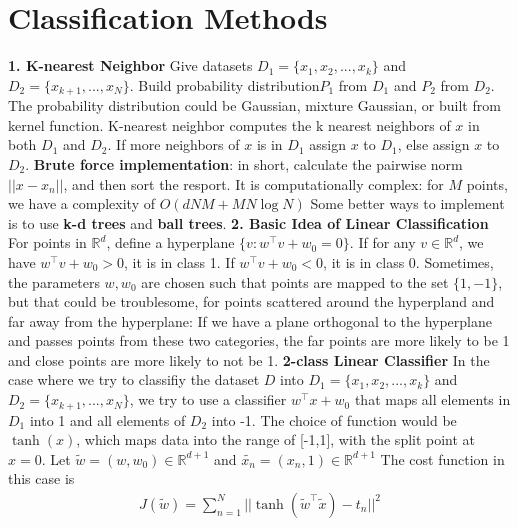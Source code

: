 \documentclass[11pt]{article}
\theoremstyle{plain}
\theoremstyle{definition}
\begin{document}
\section{Classification Methods}
\textbf{1. K-nearest Neighbor} \newline 
\vspace{5mm}
Give datasets $D_1 = \{ x_1, x_2, ..., x_k \} $ and $D_2 = \{ x_{k+1}, ..., x_N \}$. Build probability distribution$P_1$ from $D_1$ and $P_2$ from $D_2$. The probability distribution could be Gaussian, mixture Gaussian, or built from kernel function. K-nearest neighbor computes the k nearest neighbors of $x$ in both $D_1$ and $D_2$. If more neighbors of $x$ is in $D_1$ assign $x$ to $D_1$, else assign $x$ to $D_2$. \newline 
\textbf{Brute force implementation}: in short, calculate the pairwise norm $||x-x_n||$, and then sort the resport. It is computationally complex: for $M$ points, we have a complexity of $O(dNM + MN\log N)$\newline 
Some better ways to implement is to use \textbf{k-d trees} and \textbf{ball trees}.
\vspace{10mm} \newline 
\textbf{2. Basic Idea of Linear Classification}\newline
\vspace{5mm} 
For points in $\mathbb{R}^d$, define a hyperplane $\{ v : w^\top v + w_0 = 0 \}$. If for any $v \in \mathbb{R}^d$, we have $w^\top v + w_0 > 0$, it is in class 1. If $w^\top v + w_0 < 0$, it is in class 0. Sometimes, the parameters $w, w_0$ are chosen such that points are mapped to the set $\{ 1, -1\}$, but that could be troublesome, for points scattered around the hyperpland and far away from the hyperplane: If we have a plane orthogonal to the hyperplane and passes points from these two categories, the far points are more likely to be 1 and close points are more likely to not be 1. \newline 
\textbf{2-class Linear Classifier}\newline 
In the case where we try to classifiy the dataset $D$ into $D_1 = \{x_1, x_2, ..., x_k\}$ and $D_2 = \{ x_{k+1}, ..., x_N \}$, we try to use a classifier $w^\top x + w_0$ that maps all elements in $D_1$ into 1 and all elements of $D_2$ into -1. The choice of function would be $\tanh (x)$, which maps data into the range of [-1,1], with the split point at $x = 0$. Let $\tilde{w} = (w, w_0) \in \mathbb{R}^{d+1}$ and $\tilde{x_n} = (x_n, 1) \in \mathbb{R}^{d+1}$ The cost function in this case is \begin{align*}
J(\tilde{w}) = \sum\limits_{n=1}^{N} || \tanh(\tilde{w}^\top \tilde{x}) - t_n ||^2
\end{align*}
\end{document}
